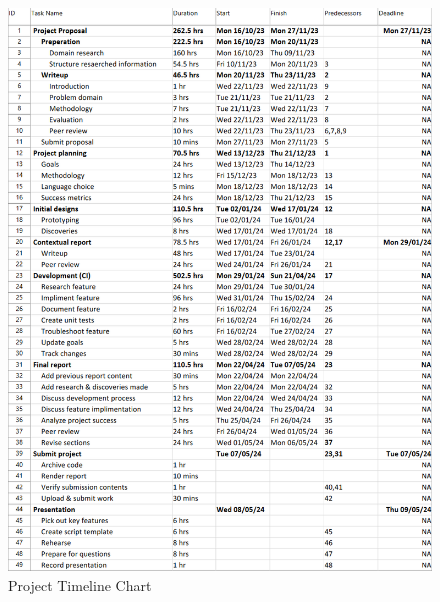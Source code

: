 \begin{figure}
    \centering
    \caption{Project Timeline Chart}
    \label{fig:ProjectTimelineChart}
    \includegraphics[width=0.7\textheight]{../TimelineChart.png}
\end{figure}
